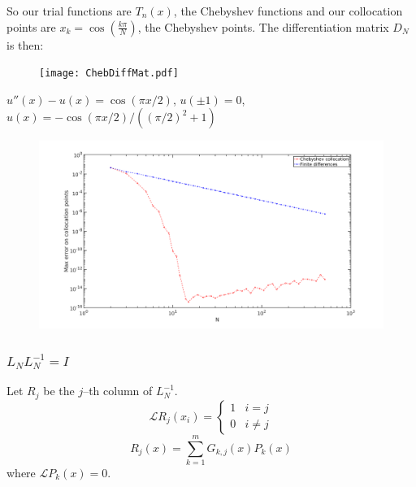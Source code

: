 \documentclass{beamer}
\begin{document}
\begin{frame}

So our trial functions are $T_n(x)$, the Chebyshev functions and our collocation points are $x_k = \cos \left ( \frac{k \pi}{N} \right )$, the Chebyshev points.
The differentiation matrix $D_N$ is then:
\begin{figure}
\texttt{[image: ChebDiffMat.pdf]}
\end{figure}

\end{frame}

\begin{frame}
$u''(x) - u(x) = \cos(\pi x / 2)$, $u(\pm 1) = 0$, $u(x) = -\cos(\pi x/2) / ( (\pi/2)^2 + 1)$
\begin{figure}
\includegraphics[width=\textwidth]{example_seminar1.png}
\end{figure}
\end{frame}


\begin{frame}
\frametitle{$L_N L_N^{-1} = I$}
Let $R_j$ be the $j$--th column of $L_N^{-1}$.
\begin{equation*}
\mathcal{L} R_j(x_i) = \begin{cases} 1 & i = j \\ 0 & i \neq j \end{cases}
\end{equation*}
\begin{equation*}
R_j(x) = \sum_{k=1}^m G_{k,j}(x) P_k(x)
\end{equation*}
where $\mathcal{L} P_k(x) = 0$.
\end{frame}
\end{document}
